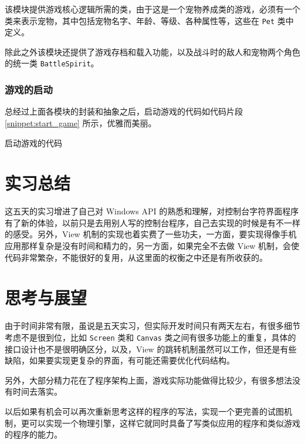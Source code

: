 \documentclass[a4paper, 11pt]{article}
\newcommand{\codeinline}{\texttt}
\begin{document}
该模块提供游戏核心逻辑所需的类，由于这是一个宠物养成类的游戏，必须有一个类来表示宠物，其中包括宠物名字、年龄、等级、各种属性等，这些在 \codeinline{Pet} 类中定义。

除此之外该模块还提供了游戏存档和载入功能，以及战斗时的敌人和宠物两个角色的统一类 \codeinline{BattleSpirit}。

\subsubsection{游戏的启动}

总经过上面各模块的封装和抽象之后，启动游戏的代码如代码片段 \ref{snippet:start_game} 所示，优雅而美丽。

\begin{snippet}
	\caption{启动游戏的代码}
	\label{snippet:start_game}
\end{snippet}

\section{实习总结}

这五天的实习增进了自己对 Windows API 的熟悉和理解，对控制台字符界面程序有了新的体验，以前只是去用别人写的控制台程序，自己去实现的时候是有不一样的感受。另外，View 机制的实现也着实费了一些功夫，一方面，要实现得像手机应用那样复杂是没有时间和精力的，另一方面，如果完全不去做 View 机制，会使代码非常繁杂，不能很好的复用，从这里面的权衡之中还是有所收获的。

\section{思考与展望}

由于时间非常有限，虽说是五天实习，但实际开发时间只有两天左右，有很多细节考虑不是很到位，比如 \codeinline{Screen} 类和 \codeinline{Canvas} 类之间有很多功能上的重复，具体的接口设计也不是很明确区分，以及，View 的跳转机制虽然可以工作，但还是有些缺陷，如果要实现更复杂的界面，有可能还需要优化代码结构。

另外，大部分精力花在了程序架构上面，游戏实际功能做得比较少，有很多想法没有时间去落实。

以后如果有机会可以再次重新思考这样的程序的写法，实现一个更完善的试图机制，更可以实现一个物理引擎，这样它就同时具备了写类似应用的程序和类似游戏的程序的能力。
\end{document}
